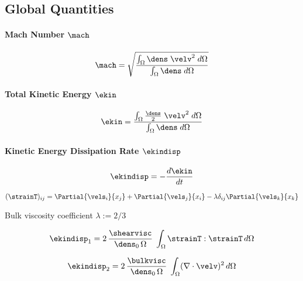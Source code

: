 \subsection{Global Quantities}

\paragraph{Mach Number $\mach$}

\begin{equation}
\label{eq:mach}
    \mach = \sqrt{\frac{\int_\Omega \dens \; \velv^2 \; d\Omega}{\int_\Omega \dens \; d\Omega}}
\end{equation}

\paragraph{Total Kinetic Energy $\ekin$}

\begin{equation}
\label{eq:ekin}
    \ekin = \frac{\int_\Omega \frac{\dens}{2} \; \velv^2 \; d\Omega}{\int_\Omega \dens \; d\Omega}
\end{equation}

\paragraph{Kinetic Energy Dissipation Rate $\ekindisp$}

\begin{equation}
\label{eq:ekindisp}
    \ekindisp = -\frac{d\ekin}{dt} 
\end{equation}

\begin{equation}
\label{eq:straintensor}
    (\strainT)_{ij} = \Partial{\vels_i}{x_j} + \Partial{\vels_j}{x_i} - \lambda \delta_{ij} \Partial{\vels_k}{x_k}
\end{equation}

Bulk viscosity coefficient $\lambda := 2/3$

\begin{equation}
\label{eq:ekindisp1}
    \ekindisp_1 = 2\,\frac{\shearvisc}{\dens_0\,\Omega} \; \int_\Omega \strainT : \strainT \, d\Omega
\end{equation}

\begin{equation}
\label{eq:ekindisp2}
    \ekindisp_2 = 2\,\frac{\bulkvisc}{\dens_0\,\Omega} \; \int_\Omega (\nabla \cdot \velv)^2 \, d\Omega
\end{equation}

